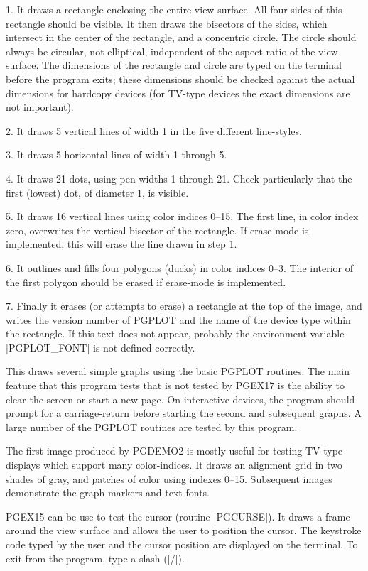 \item{1.} It draws a rectangle enclosing the entire view surface. All four
sides of this rectangle should be visible. It then draws the bisectors
of the sides, which intersect in the center of the rectangle, and a
concentric circle. The circle should always be circular, not elliptical,
independent of the aspect ratio of the view surface. The dimensions of
the rectangle and circle are typed on the terminal before the program
exits; these dimensions should be checked against the actual dimensions
for hardcopy devices (for TV-type devices the exact dimensions are not
important). 
\item{2.} It draws 5 vertical lines of width 1 in the five different
line-styles. 
\item{3.} It draws 5 horizontal lines of width 1 through 5. 
\item{4.} It draws 21 dots, using pen-widths 1 through 21. Check particularly
that the first (lowest) dot, of diameter 1, is visible. 
\item{5.} It draws 16 vertical lines using color indices 0--15. The first line,
in color index zero, overwrites the vertical bisector of the rectangle.
If erase-mode is implemented, this will erase the line drawn in step 1. 
\item{6.} It outlines and fills four polygons (ducks) in color indices 
0--3. The interior of the first polygon should be erased if erase-mode is
implemented. 
\item{7.} Finally it erases (or attempts to erase) a rectangle at the top of
the image, and writes the version number of PGPLOT and the name of the
device type within the rectangle. If this text does not appear, probably
the environment variable |PGPLOT_FONT| is not defined correctly. 

This draws several simple graphs using the basic PGPLOT routines. The main 
feature that this program tests that is not tested by PGEX17 is the 
ability to clear the screen or start a new page. On interactive devices, 
the program should prompt for a carriage-return before starting the 
second and subsequent graphs.  A large number of the PGPLOT routines are 
tested by this program.

The first image produced by PGDEMO2 is mostly useful for testing TV-type
displays which support many color-indices. It draws an alignment grid in
two shades of gray, and patches of color using indexes 0--15. Subsequent 
images demonstrate the graph markers and text fonts.

PGEX15 can be use to test the cursor (routine |PGCURSE|). It draws a 
frame around the view surface and allows the user to position the 
cursor. The keystroke code typed by the user and the cursor position are 
displayed on the terminal. To exit from the program, type a slash (|/|).

\endchapter
